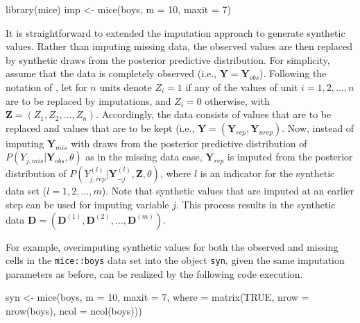 \documentclass[psych,article,submit,moreauthors,pdftex]{mdpi}
\newenvironment{Shaded}{\begin{snugshade}}{\end{snugshade}}
\newcommand{\AttributeTok}[1]{\textcolor[rgb]{0.77,0.63,0.00}{#1}}
\newcommand{\ConstantTok}[1]{\textcolor[rgb]{0.00,0.00,0.00}{#1}}
\newcommand{\DecValTok}[1]{\textcolor[rgb]{0.00,0.00,0.81}{#1}}
\newcommand{\FunctionTok}[1]{\textcolor[rgb]{0.00,0.00,0.00}{#1}}
\newcommand{\NormalTok}[1]{#1}
\newcommand{\OtherTok}[1]{\textcolor[rgb]{0.56,0.35,0.01}{#1}}
\begin{document}
\begin{Shaded}
\begin{Highlighting}[]
\FunctionTok{library}\NormalTok{(mice)}
\NormalTok{imp }\OtherTok{\textless{}{-}} \FunctionTok{mice}\NormalTok{(boys, }
            \AttributeTok{m =} \DecValTok{10}\NormalTok{,}
            \AttributeTok{maxit =} \DecValTok{7}\NormalTok{)}
\end{Highlighting}
\end{Shaded}

It is straightforward to extended the imputation approach to generate
synthetic values. Rather than imputing missing data, the observed values
are then replaced by synthetic draws from the posterior predictive
distribution. For simplicity, assume that the data is completely
observed (i.e., \(\textbf{Y} = \textbf{Y}_{obs}\)). Following the
notation of \citet{reiter_raghunathan_multiple_2007}, let for \(n\)
units denote \(Z_i = 1\) if any of the values of unit
\(i = 1, 2, \dots, n\) are to be replaced by imputations, and
\(Z_i = 0\) otherwise, with \(\textbf{Z} = (Z_1, Z_2, \dots, Z_n)\).
Accordingly, the data consists of values that are to be replaced and
values that are to be kept (i.e.,
\(\textbf{Y} = (\textbf{Y}_{rep}, \textbf{Y}_{nrep})\). Now, instead of
imputing \(\textbf{Y}_{mis}\) with draws from the posterior predictive
distribution of \(P(Y_{j, mis} | \textbf{Y}_{obs}, \theta)\) as in the
missing data case, \(\textbf{Y}_{rep}\) is imputed from the posterior
distribution of
\(P(Y^{(l)}_{j, rep} | \textbf{Y}^{(l)}_{-j}, \textbf{Z}, \theta)\),
where \(l\) is an indicator for the synthetic data set
(\(l = 1, 2, \dots, m\)). Note that synthetic values that are imputed at
an earlier step can be used for imputing variable \(j\). This process
results in the synthetic data
\(\textbf{D} = (\textbf{D}^{(1)}, \textbf{D}^{(2)}, \dots, \textbf{D}^{(m)})\).

For example, overimputing synthetic values for both the observed and
missing cells in the \texttt{mice::boys} data set into the object
\texttt{syn}, given the same imputation parameters as before, can be
realized by the following code execution.

\begin{Shaded}
\begin{Highlighting}[]
\NormalTok{syn }\OtherTok{\textless{}{-}} \FunctionTok{mice}\NormalTok{(boys, }
            \AttributeTok{m =} \DecValTok{10}\NormalTok{,}
            \AttributeTok{maxit =} \DecValTok{7}\NormalTok{, }
            \AttributeTok{where =} \FunctionTok{matrix}\NormalTok{(}\ConstantTok{TRUE}\NormalTok{, }
                           \AttributeTok{nrow =} \FunctionTok{nrow}\NormalTok{(boys),}
                           \AttributeTok{ncol =} \FunctionTok{ncol}\NormalTok{(boys)))}
\end{Highlighting}
\end{Shaded}
\end{document}

